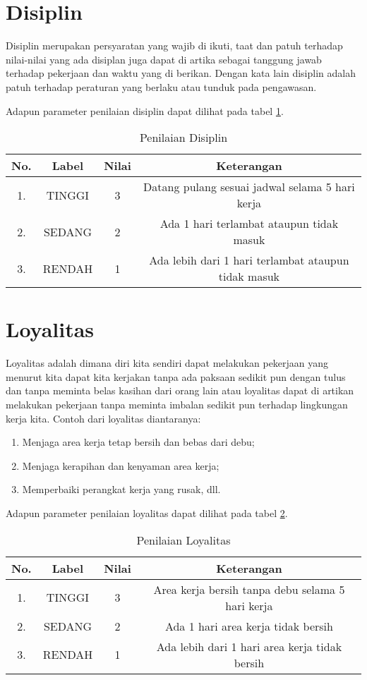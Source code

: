 \section{Disiplin}
Disiplin merupakan persyaratan yang wajib di ikuti, taat dan patuh terhadap nilai-nilai yang ada disiplan juga dapat di artika sebagai tanggung jawab terhadap pekerjaan dan waktu yang di berikan. Dengan kata lain disiplin adalah patuh terhadap peraturan yang berlaku
atau tunduk pada pengawasan.

Adapun parameter penilaian disiplin dapat dilihat pada tabel \ref{tab:nilaidisiplin}.

\begin{table}[H]
\caption{Penilaian Disiplin}
\centering
\begin{tabular}{|c|c|c|c|}
\hline
\textbf{No.}&\textbf{Label}&\textbf{Nilai}&\textbf{Keterangan}\\
\hline
1.&TINGGI&3&Datang pulang sesuai jadwal selama 5 hari kerja\\
\hline
2.&SEDANG&2&Ada 1 hari terlambat ataupun tidak masuk\\
\hline
3.&RENDAH&1&Ada lebih dari 1 hari terlambat ataupun tidak masuk\\
\hline
\end{tabular}
\label{tab:nilaidisiplin}
\end{table}

\section{Loyalitas}
Loyalitas adalah dimana diri kita sendiri dapat melakukan pekerjaan yang menurut kita dapat kita kerjakan tanpa ada paksaan sedikit pun
dengan tulus dan tanpa meminta belas kasihan dari orang lain atau loyalitas dapat di artikan melakukan pekerjaan tanpa meminta imbalan sedikit pun terhadap lingkungan kerja kita.
Contoh dari loyalitas diantaranya:
\begin{enumerate}
\item Menjaga area kerja tetap bersih dan bebas dari debu;
\item Menjaga kerapihan dan kenyaman area kerja;
\item Memperbaiki perangkat kerja yang rusak, dll.
\end{enumerate}
Adapun parameter penilaian loyalitas dapat dilihat pada tabel \ref{tab:nilailoyalitas}.

\begin{table}[H]
\caption{Penilaian Loyalitas}
\centering
\begin{tabular}{|c|c|c|c|}
\hline
\textbf{No.}&\textbf{Label}&\textbf{Nilai}&\textbf{Keterangan}\\
\hline
1.&TINGGI&3&Area kerja bersih tanpa debu selama 5 hari kerja\\
\hline
2.&SEDANG&2&Ada 1 hari area kerja tidak bersih\\
\hline
3.&RENDAH&1&Ada lebih dari 1 hari area kerja tidak bersih\\
\hline
\end{tabular}
\label{tab:nilailoyalitas}
\end{table}

